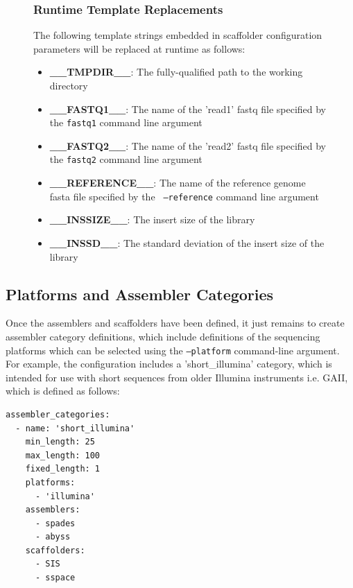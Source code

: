 \documentclass[a4paper,10pt]{article}
\begin{document}
\begin{figure}[H]
\subsubsection{Runtime Template Replacements}

The following template strings embedded in scaffolder configuration parameters will be replaced at runtime as
follows:

\begin{itemize}
  \setlength\itemsep{0em}
  \item \textbf{\_\_TMPDIR\_\_}: The fully-qualified path to the working directory
  \item \textbf{\_\_FASTQ1\_\_}: The name of the 'read1' fastq file specified by the {\tt fastq1}
command line argument
  \item \textbf{\_\_FASTQ2\_\_}: The name of the 'read2' fastq file specified by the {\tt fastq2}
command line argument
  \item \textbf{\_\_REFERENCE\_\_}: The name of the reference genome fasta file specified by the {\tt
--reference} command line argument
  \item \textbf{\_\_INSSIZE\_\_}: The insert size of the library
  \item \textbf{\_\_INSSD\_\_}: The standard deviation of the insert size of the library
\end{itemize}

\end{figure}
\subsection{Platforms and Assembler Categories}

Once the assemblers and scaffolders have been defined, it just remains to create assembler category definitions, which include definitions of the sequencing platforms which can be selected using the {\tt --platform} command-line argument. For example, the configuration includes a 'short\_illumina' category, which is intended for use with short sequences from older Illumina instruments i.e. GAII, which is defined as follows:

\begin{verbatim}
assembler_categories:
  - name: 'short_illumina'
    min_length: 25
    max_length: 100
    fixed_length: 1
    platforms:
      - 'illumina'
    assemblers:
      - spades
      - abyss
    scaffolders:
      - SIS
      - sspace
\end{verbatim}
\end{document}
